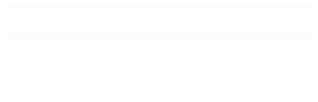 \documentclass[a4paper,twoside,11pt]{article}
\begin{document}
\begin{titlepage}
\pagecolor{titlepagecolor}

\vspace*{25mm}
{\color{white} \noindent \rule{\textwidth}{3mm}}
\begin{center}
\Huge
\textcolor{white}{\textbf{GTerm}: A Python Based Telnet Terminal for Unusual Applications}
\end{center}
\vspace*{2mm}
{\color{white} \noindent \rule{\textwidth}{3mm}}

\vspace*{6cm}

\begin{center}
\Large 
\textcolor{white}{
Nick Glazzard\\
NGIPT\\
}
\end{center}

\vspace*{2cm}

\begin{center}
\Large 
\textcolor{white}{
Version 0.4\\
\today
}
\end{center}

\end{titlepage}

\pagecolor{white}






\end{document}
